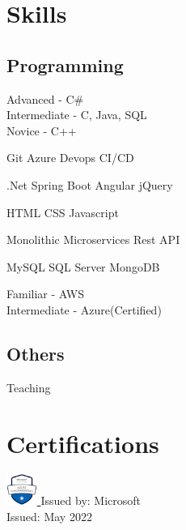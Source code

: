 \documentclass[]{deedy-resume-openfont}
\begin{document}
\begin{minipage}[t]{0.33\textwidth} 


\section{Skills}
\subsection{Programming}
\sectionsep
{}
\textbullet{} Advanced - C\#\\
\textbullet{} Intermediate - C, Java, SQL\\ 
\textbullet{} Novice - C++\\
\sectionsep

\textbullet{} Git
\textbullet{} Azure Devops CI/CD
\sectionsep

\textbullet{}  .Net
\textbullet{} Spring Boot
\textbullet{} Angular
\textbullet{} jQuery 
\sectionsep

\textbullet{} HTML\textbullet{} CSS\textbullet{} Javascript
\sectionsep

\textbullet{} Monolithic
\textbullet{} Microservices
\textbullet{} Rest API
\sectionsep

\textbullet{} MySQL
\textbullet{} SQL Server
\textbullet{} MongoDB
\sectionsep

\textbullet{} Familiar - AWS\\
\textbullet{} Intermediate - Azure(Certified)
\sectionsep

\subsection{Others}
\sectionsep
\textbullet{} Teaching
\sectionsep
\section{Certifications} 
   
\textbullet{} \href{https://learn.microsoft.com/api/credentials/share/en-us/SinghAbhishek-7956/49208106931A01DE?sharingId=F1D3E3131BE67783}{{\includegraphics[width=1cm]{fonts/microsoft-certified-azure-fundamentals.png}} }
    \hspace{0.3cm} Issued by: Microsoft\\
    \hspace{0.3cm} Issued: May 2022\\


\end{minipage}
\end{document}
